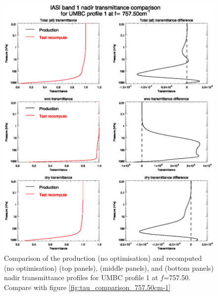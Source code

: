 \begin{figure}[htp]
  \centering
  \includegraphics[scale=0.8]{graphics/correct_tau_comparison_757.50cm-1.eps}
  \caption{Comparison of the production (no optimisation) and recomputed (no optimisation)  (top panels),  (middle panels), and  (bottom panels) nadir  transmittance profiles for UMBC profile 1 at $f$=757.50\invcm{}. Compare with figure \ref{fig:tau_comparison_757.50cm-1}}
  \label{fig:correct_tau_comparison_757.50cm-1}
\end{figure}
